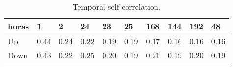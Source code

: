 \begin{table}[H] 
    \caption{Temporal self correlation.\label{temp_corr}}
    \begin{tabularx}{\textwidth}{CCCCCCCCCC}
    \toprule
        \textbf{horas} & 1 & 2 & 24 & 23 & 25 & 168 & 144 & 192 & 48 \\
        \midrule
    Up		& 0.44 & 0.24 & 0.22 & 0.19 & 0.19 & 0.17 & 0.16 & 0.16 & 0.16 \\
    Down		& 0.43 & 0.22 & 0.25 & 0.20 & 0.19 & 0.21 & 0.19 & 0.20 & 0.19 \\
    \bottomrule
    \end{tabularx}
    \end{table}